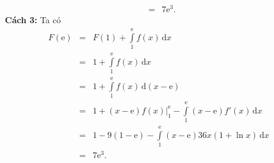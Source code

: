 \begin{ex}
{\begin{eqnarray*}
			&=& 7\mathrm{e}^3.
		\end{eqnarray*}
		\textbf{Cách 3:} Ta có 
		\allowdisplaybreaks
		\begin{eqnarray*}
			F(\mathrm{e}) &=& F(1) + \displaystyle\int\limits_{1}^{\mathrm{e}} f(x) \mathrm{\,d}x\\
			&=& 1 + \displaystyle\int\limits_{1}^{\mathrm{e}} f(x) \mathrm{\,d}x\\
			&=& 1 + \displaystyle\int\limits_{1}^{\mathrm{e}} f(x) \mathrm{\,d}(x-\mathrm{e}) \\
			&=& 1 + (x-\mathrm{e})f(x)\Bigg|_{1}^{\mathrm{e}} - \displaystyle\int\limits_{1}^{\mathrm{e}} (x-\mathrm{e})f'(x) \mathrm{\,d}x\\
			&=& 1 - 9(1-\mathrm{e}) - \displaystyle\int\limits_{1}^{\mathrm{e}} (x-\mathrm{e})36x(1+\ln x) \mathrm{\,d}x  \\
			&=& 7\mathrm{e}^3.
		\end{eqnarray*}
	}
\end{ex}
